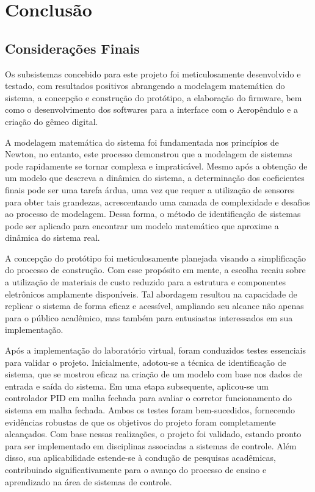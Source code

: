 \chapter{Conclusão}
\label{cap_conclusao}

\section{Considerações Finais}
\label{concideracoes_finais}

Os subsistemas concebido para este projeto foi meticulosamente desenvolvido e testado, com resultados positivos abrangendo a modelagem matemática do sistema, a concepção e construção do protótipo, a elaboração do firmware, bem como o desenvolvimento dos softwares para a interface com o Aeropêndulo e a criação do gêmeo digital.

A modelagem matemática do sistema foi fundamentada nos princípios de Newton, no entanto, este processo demonstrou que a modelagem de sistemas pode rapidamente se tornar complexa e impraticável. Mesmo após a obtenção de um modelo que descreva a dinâmica do sistema, a determinação dos coeficientes finais pode ser uma tarefa árdua, uma vez que requer a utilização de sensores para obter tais grandezas, acrescentando uma camada de complexidade e desafios ao processo de modelagem. Dessa forma, o método de identificação de sistemas pode ser aplicado para encontrar um modelo matemático que aproxime a dinâmica do sistema real.


A concepção do protótipo foi meticulosamente planejada visando a simplificação do processo de construção. Com esse propósito em mente, a escolha recaiu sobre a utilização de materiais de custo reduzido para a estrutura e componentes eletrônicos amplamente disponíveis. Tal abordagem resultou na capacidade de replicar o sistema de forma eficaz e acessível, ampliando seu alcance não apenas para o público acadêmico, mas também para entusiastas interessados em sua implementação.


Após a implementação do laboratório virtual, foram conduzidos testes essenciais para validar o projeto. Inicialmente, adotou-se a técnica de identificação de sistema, que se mostrou eficaz na criação de um modelo com base nos dados de entrada e saída do sistema. Em uma etapa subsequente, aplicou-se um controlador PID em malha fechada para avaliar o corretor funcionamento do sistema em malha fechada. Ambos os testes foram bem-sucedidos, fornecendo evidências robustas de que os objetivos do projeto foram completamente alcançados. Com base nessas realizações, o projeto foi validado, estando pronto para ser implementado em disciplinas associadas a sistemas de controle. Além disso, sua aplicabilidade estende-se à condução de pesquisas acadêmicas, contribuindo significativamente para o avanço do processo de ensino e aprendizado na área de sistemas de controle.

